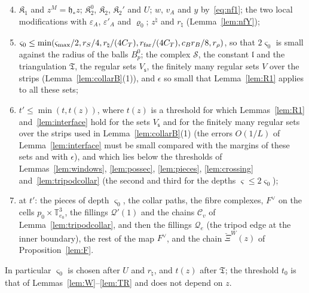 \begin{enumerate}
\setcounter{enumi}{3}
\item $\mathfrak K_1$ and $z^M=\mathfrak h_*z$; $\mathfrak K_2^0$, $\mathfrak K_2$, $\mathfrak K_2'$ and $U$; $w$, $v_A$ and $y$
by~\eqref{eq:nf1}; the two local modifications with $\varepsilon_A$, $\varepsilon'_A$ and $\varrho_0$; $z^\natural$ and $r_\natural$
(Lemma~\ref{lem:nfY});
\item $\varsigma_0\le\min(\varsigma_{\max}/2,r_S/4,r_\natural/(4C_T),r_{\rm far}/(4C_T),c_Br_B/8,r_\rho)$, so that $2\varsigma_0$ is small against the
radius of the balls $B^0_p$; the complex $\mathscr S$, the constant $\mathfrak l$ and the triangulation
$\mathfrak T$, the regular sets $V_{\mathsf s}$, the finitely many regular sets $V$ over the strips (Lemma~\ref{lem:collarB}(1)),
and $\epsilon$ so small that Lemma~\ref{lem:R1} applies to all these sets;
\item $t'\le\min(t,t(z))$, where $t(z)$ is a threshold for which Lemmas~\ref{lem:R1} and~\ref{lem:interface} hold for the sets
$V_{\mathsf s}$ and for the finitely many regular sets over the strips used in Lemma~\ref{lem:collarB}(1) (the errors $O(1/L)$ of
Lemma~\ref{lem:interface} must be small compared with the margins of these sets and with $\epsilon$), and which lies below
the thresholds of Lemmas~\ref{lem:windows}, \ref{lem:possec}, \ref{lem:pieces}, \ref{lem:crossing} and~\ref{lem:tripodcollar}
(the second and third for the depths $\varsigma\le2\varsigma_0$);
\item at $t'$: the pieces of depth $\varsigma_0$, the collar paths, the fibre complexes, $F^\vee$ on the cells
$p_0\times\mathbb T^3_{e_0}$, the fillings $\mathcal Q'(1)$ and the chains $\mathscr C_v$ of Lemma~\ref{lem:tripodcollar}, and
then the fillings $\mathscr Q_e$ (the tripod edge at the inner boundary), the rest of the map $F^\vee$, and the chain
$\check\Xi^W(z)$ of Proposition~\ref{lem:F}.
\end{enumerate}
In particular $\varsigma_0$ is chosen after $U$ and $r_\natural$, and $t(z)$ after $\mathfrak T$; the threshold $t_0$ is that of
Lemmas~\ref{lem:W}--\ref{lem:TR} and does not depend on $z$.

